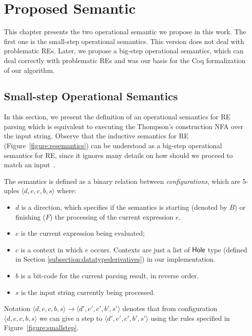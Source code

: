 \documentclass[oneside,12pt]{scrbook}
\theoremstyle{definition}
\newcommand{\D}[1]{\blue{\mathsf{#1}}}
\newcommand{\conf}[1]{\ensuremath{\langle #1 \rangle}}
\theoremstyle{plain}
\theoremstyle{definition}
\begin{document}
\chapter{Proposed Semantic}
\label{chapter:proposedsemantic}

This chapter presents the two operational semantic we propose in this work. The first one is the small-step operational semantics. This version does not deal with problematic REs. Later, we propose a big-step operational semantics, which can deal correctly with problematic REs and was our basis for the Coq formalization of our algorithm. %

\section{Small-step Operational Semantics}
\label{section:smallstepsemantics}

In this section, we present the definition of an operational semantics for RE parsing which is
equivalent to executing the Thompson's construction NFA over the input string. Observe that
the inductive semantics for RE (Figure~\ref{figure:resemantics}) can be understood as a big-step
operational semantics for RE, since it ignores many details on how should we proceed to match
an input~\cite{Rathnayake2011}.

The semantics is defined as a binary relation between \emph{configurations}, which are 5-uples
$\conf{d,e,c,b,s}$ where:
\begin{itemize}
	\item $d$ is a direction, which specifies if the semantics is starting (denoted by $B$) or
	finishing ($F$) the processing of the current expression $e$.
	\item $e$ is the current expression being evaluated;
	\item $c$ is a context in which $e$ occurs. Contexts are just a list of
	\ensuremath{\D{Hole}} type (defined in Section \ref{subsection:datatypederivatives}) in our implementation.
	\item $b$ is a bit-code for the current parsing result, in reverse order.
	\item $s$ is the input string currently being processed.
\end{itemize}
Notation $\conf{d,e,c,b,s}\to\conf{d',e',c',b',s'}$ denotes that from
configuration $\conf{d,e,c,b,s}$ we can give a step to $\conf{d',e',c',b',s'}$ using the rules specified in Figure~\ref{figure:smallstep}.
\end{document}

